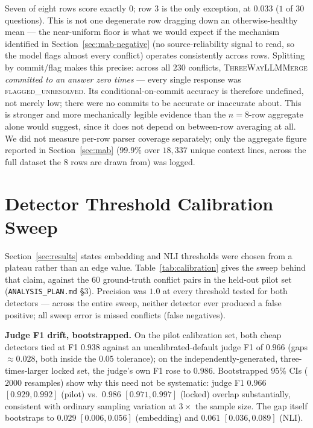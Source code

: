\documentclass[11pt]{article}
\begin{document}
\noindent Seven of eight rows score exactly $0$; row $3$ is the only
exception, at $0.033$ ($1$ of $30$ questions). This is not one degenerate row
dragging down an otherwise-healthy mean --- the near-uniform floor is what we
would expect if the mechanism identified in Section~\ref{sec:mab-negative} (no
source-reliability signal to read, so the model flags almost every conflict)
operates consistently across rows. Splitting by commit/flag makes this
precise: across all $230$ conflicts, \textsc{ThreeWayLLMMerge} \emph{committed
to an answer zero times} --- every single response was
\textsc{flagged\_unresolved}. Its conditional-on-commit accuracy is therefore
undefined, not merely low; there were no commits to be accurate or inaccurate
about. This is stronger and more mechanically legible evidence than the
$n{=}8$-row aggregate alone would suggest, since it does not depend on
between-row averaging at all. We did not measure per-row parser coverage
separately; only the aggregate figure reported in Section~\ref{sec:mab}
($99.9\%$ over $18{,}337$ unique context
lines, across the full dataset the $8$ rows are drawn from) was logged.

\section{Detector Threshold Calibration Sweep}
\label{sec:calibration}

Section~\ref{sec:results} states embedding and NLI thresholds were chosen
from a plateau rather than an edge value. Table~\ref{tab:calibration} gives
the sweep behind that claim, against the $60$ ground-truth conflict pairs in
the held-out pilot set (\texttt{ANALYSIS\_PLAN.md} \S3). Precision was
$1.0$ at every threshold tested for both detectors --- across the entire
sweep, neither detector ever produced a false positive; all sweep error is
missed conflicts (false negatives).

\textbf{Judge F1 drift, bootstrapped.} On the pilot calibration set, both
cheap detectors tied at F1 $0.938$ against an uncalibrated-default judge F1
of $0.966$ (gaps $\approx0.028$, both inside the $0.05$ tolerance); on the
independently-generated, three-times-larger locked set, the judge's own F1
rose to $0.986$. Bootstrapped $95\%$
CIs ($2000$ resamples) show why this need not be systematic: judge F1
$0.966$ $[0.929,0.992]$ (pilot) vs.\ $0.986$ $[0.971,0.997]$ (locked)
overlap substantially, consistent with ordinary sampling variation at
$3\times$ the sample size. The gap itself bootstraps to $0.029$
$[0.006,0.056]$ (embedding) and $0.061$ $[0.036,0.089]$ (NLI).
\end{document}
